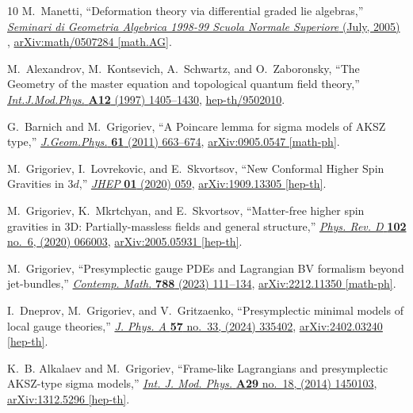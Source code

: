 \documentclass[a4paper,12pt]{article}
\numberwithin{equation}{section} %
\begin{document}
\begin{thebibliography}{10}
M.~Manetti, ``Deformation theory via differential graded lie algebras,'' \href{http://dx.doi.org/10.48550/ARXIV.MATH/0507284}{{\em Seminari di Geometria Algebrica 1998-99 Scuola Normale Superiore} (July, 2005) }, \href{http://arxiv.org/abs/math/0507284}{{\ttfamily arXiv:math/0507284 [math.AG]}}.

M.~Alexandrov, M.~Kontsevich, A.~Schwartz, and O.~Zaboronsky, ``{T}he {G}eometry of the master equation and topological quantum field theory,'' \href{http://dx.doi.org/10.1142/S0217751X97001031}{{\em Int.J.Mod.Phys.} {\bfseries A12} (1997) 1405--1430},
\href{http://arxiv.org/abs/hep-th/9502010}{{\ttfamily hep-th/9502010}}.

G.~Barnich and M.~Grigoriev, ``{A} {P}oincare lemma for sigma models of {AKSZ} type,'' \href{http://dx.doi.org/10.1016/j.geomphys.2010.11.014}{{\em J.Geom.Phys.} {\bfseries 61} (2011) 663--674},
\href{http://arxiv.org/abs/0905.0547}{{\ttfamily arXiv:0905.0547 [math-ph]}}.

M.~Grigoriev, I.~Lovrekovic, and E.~Skvortsov, ``{New Conformal Higher Spin Gravities in $3d$},'' \href{http://dx.doi.org/10.1007/JHEP01(2020)059}{{\em JHEP} {\bfseries 01} (2020) 059}, \href{http://arxiv.org/abs/1909.13305}{{\ttfamily arXiv:1909.13305 [hep-th]}}.

M.~Grigoriev, K.~Mkrtchyan, and E.~Skvortsov, ``{Matter-free higher spin gravities in 3D: Partially-massless fields and general structure},'' \href{http://dx.doi.org/10.1103/PhysRevD.102.066003}{{\em Phys. Rev. D} {\bfseries 102} no.~6, (2020) 066003}, \href{http://arxiv.org/abs/2005.05931}{{\ttfamily arXiv:2005.05931 [hep-th]}}.

M.~Grigoriev, ``{Presymplectic gauge PDEs and Lagrangian BV formalism beyond jet-bundles},'' \href{http://dx.doi.org/10.1090/conm/788/15822}{{\em Contemp. Math.} {\bfseries 788} (2023) 111--134}, \href{http://arxiv.org/abs/2212.11350}{{\ttfamily arXiv:2212.11350 [math-ph]}}.

I.~Dneprov, M.~Grigoriev, and V.~Gritzaenko, ``{Presymplectic minimal models of local gauge theories},'' \href{http://dx.doi.org/10.1088/1751-8121/ad65a3}{{\em J. Phys. A} {\bfseries 57} no.~33, (2024) 335402}, \href{http://arxiv.org/abs/2402.03240}{{\ttfamily arXiv:2402.03240 [hep-th]}}.

K.~B. Alkalaev and M.~Grigoriev, ``{Frame-like Lagrangians and presymplectic AKSZ-type sigma models},'' \href{http://dx.doi.org/10.1142/S0217751X14501036}{{\em Int. J. Mod. Phys.} {\bfseries A29} no.~18, (2014) 1450103},
\href{http://arxiv.org/abs/1312.5296}{{\ttfamily arXiv:1312.5296 [hep-th]}}.


\end{thebibliography}
\end{document}
